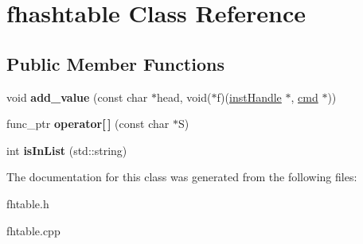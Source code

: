 \hypertarget{classfhashtable}{}\section{fhashtable Class Reference}
\label{classfhashtable}
\subsection*{Public Member Functions}
\begin{DoxyCompactItemize}
\item 
void {\bfseries add\+\_\+value} (const char $\ast$head, void($\ast$f)(\hyperlink{structinstHandle}{inst\+Handle} $\ast$, \hyperlink{structCMD__struct}{cmd} $\ast$))\hypertarget{classfhashtable_ab248fe23fdeb235a2ffcf9e5fc1a10ea}{}\label{classfhashtable_ab248fe23fdeb235a2ffcf9e5fc1a10ea}

\item 
func\+\_\+ptr {\bfseries operator\mbox{[}$\,$\mbox{]}} (const char $\ast$S)\hypertarget{classfhashtable_afb70e3247680db865a6cba11674623f4}{}\label{classfhashtable_afb70e3247680db865a6cba11674623f4}

\item 
int {\bfseries is\+In\+List} (std\+::string)\hypertarget{classfhashtable_a5846edcf45d3993b2e2962e266e1aa6f}{}\label{classfhashtable_a5846edcf45d3993b2e2962e266e1aa6f}

\end{DoxyCompactItemize}


The documentation for this class was generated from the following files\+:\begin{DoxyCompactItemize}
\item 
fhtable.\+h\item 
fhtable.\+cpp\end{DoxyCompactItemize}
